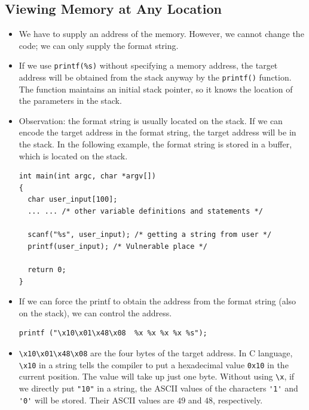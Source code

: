 \subsection{Viewing Memory at Any Location}


   \begin{itemize}
   \item We have to supply an address of the memory. However, we cannot change
   the code; we can only supply the format string.
   \item If we use {\tt printf(\%s)} without specifying a memory address, the
   target address will be obtained from the stack anyway by the {\tt printf()}
   function. The function maintains an initial stack pointer, so it knows the location
   of the parameters in the stack.

   \item Observation: the format string is usually located on the stack. If we
   can encode the target address in the format string, the target address will
   be in the stack. In the following example, the format string is stored in
   a buffer, which is located on the stack.

\begin{lstlisting}
int main(int argc, char *argv[])
{
  char user_input[100];
  ... ... /* other variable definitions and statements */

  scanf("%s", user_input); /* getting a string from user */
  printf(user_input); /* Vulnerable place */

  return 0;
}
\end{lstlisting}


   \item If we can force the printf to obtain the address from the format
   string (also on the stack), we can control the address.

\begin{verbatim}
printf ("\x10\x01\x48\x08  %x %x %x %x %s");
\end{verbatim}


   \item \verb|\x10\x01\x48\x08| are the four bytes of the target address.
         In C language, \verb|\x10| in a string tells the compiler to put 
         a hexadecimal value \verb|0x10| in the current position. The value
         will take up just one byte. Without using \verb|\x|, if we directly
         put \verb|"10"| in a string, the ASCII values of the characters \verb|'1'|
         and \verb|'0'| will be stored. Their ASCII values are
         $49$ and $48$, respectively.


\end{itemize}
